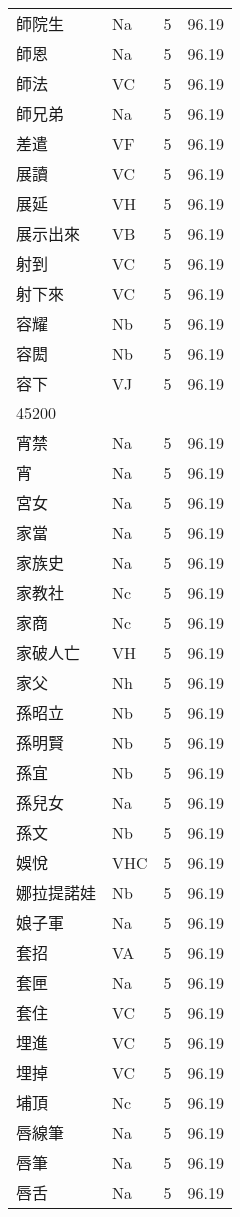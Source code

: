\documentclass[twocolumn]{book}
\begin{document}
\begin{supertabular}{llrr}
師院生 & Na & 5 &  96.19\\
師恩 & Na & 5 &  96.19\\
師法 & VC & 5 &  96.19\\
師兄弟 & Na & 5 &  96.19\\
差遣 & VF & 5 &  96.19\\
展讀 & VC & 5 &  96.19\\
展延 & VH & 5 &  96.19\\
展示出來 & VB & 5 &  96.19\\
射到 & VC & 5 &  96.19\\
射下來 & VC & 5 &  96.19\\
容耀 & Nb & 5 &  96.19\\
容閎 & Nb & 5 &  96.19\\
容下 & VJ & 5 &  96.19\\
45200\\
宵禁 & Na & 5 &  96.19\\
宵 & Na & 5 &  96.19\\
宮女 & Na & 5 &  96.19\\
家當 & Na & 5 &  96.19\\
家族史 & Na & 5 &  96.19\\
家教社 & Nc & 5 &  96.19\\
家商 & Nc & 5 &  96.19\\
家破人亡 & VH & 5 &  96.19\\
家父 & Nh & 5 &  96.19\\
孫昭立 & Nb & 5 &  96.19\\
孫明賢 & Nb & 5 &  96.19\\
孫宜 & Nb & 5 &  96.19\\
孫兒女 & Na & 5 &  96.19\\
孫文 & Nb & 5 &  96.19\\
娛悅 & VHC & 5 &  96.19\\
娜拉提諾娃 & Nb & 5 &  96.19\\
娘子軍 & Na & 5 &  96.19\\
套招 & VA & 5 &  96.19\\
套匣 & Na & 5 &  96.19\\
套住 & VC & 5 &  96.19\\
埋進 & VC & 5 &  96.19\\
埋掉 & VC & 5 &  96.19\\
埔頂 & Nc & 5 &  96.19\\
唇線筆 & Na & 5 &  96.19\\
唇筆 & Na & 5 &  96.19\\
唇舌 & Na & 5 &  96.19\\

\end{supertabular}
\end{document}
